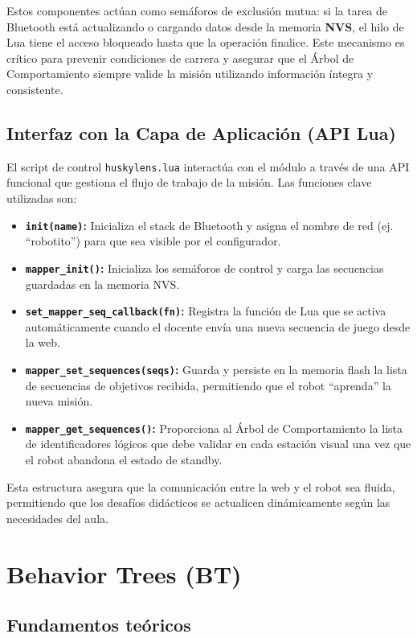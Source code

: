 \documentclass{prgrado}
\begin{document}
Estos componentes actúan como semáforos de exclusión mutua: si la tarea de Bluetooth está actualizando o cargando datos desde la memoria \textbf{NVS}, el hilo de Lua tiene el acceso bloqueado hasta que la operación finalice. Este mecanismo es crítico para prevenir condiciones de carrera y asegurar que el Árbol de Comportamiento siempre valide la misión utilizando información íntegra y consistente.


\section{Interfaz con la Capa de Aplicación (API Lua)}
El script de control \texttt{huskylens.lua} interactúa con el módulo a través de una API funcional que gestiona el flujo de trabajo de la misión. Las funciones clave utilizadas son:

\begin{itemize}
    \item \textbf{\texttt{init(name)}:} Inicializa el stack de Bluetooth y asigna el nombre de red (ej. ``robotito'') para que sea visible por el configurador.
    \item \textbf{\texttt{mapper\_init()}:} Inicializa los semáforos de control y carga las secuencias guardadas en la memoria NVS.
    \item \textbf{\texttt{set\_mapper\_seq\_callback(fn)}:} Registra la función de Lua que se activa automáticamente cuando el docente envía una nueva secuencia de juego desde la web.
    \item \textbf{\texttt{mapper\_set\_sequences(seqs)}:} Guarda y persiste en la memoria flash la lista de secuencias de objetivos recibida, permitiendo que el robot ``aprenda'' la nueva misión.
    \item \textbf{\texttt{mapper\_get\_sequences()}:} Proporciona al Árbol de Comportamiento la lista de identificadores lógicos que debe validar en cada estación visual una vez que el robot abandona el estado de standby.
\end{itemize}

Esta estructura asegura que la comunicación entre la web y el robot sea fluida, permitiendo que los desafíos didácticos se actualicen dinámicamente según las necesidades del aula.

\chapter{Behavior Trees (BT)}

\section{Fundamentos teóricos}
\end{document}
